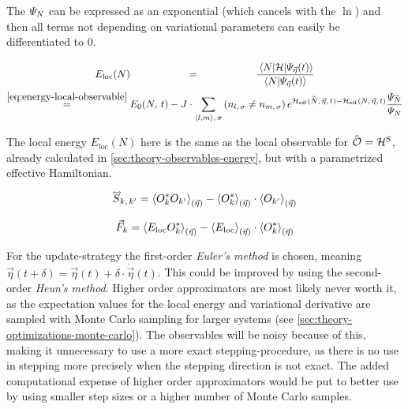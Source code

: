 The $\psiN$ can be expressed as an exponential (which cancels with the $\ln$) and then all terms not depending on variational parameters can easily be differentiated to 0.

\begin{equation}
    \label{eq:local-energy-definition}
    \begin{gathered}
        E_\text{loc}(N) \stackrel{\phantom{\ref{eq:energy-local-observable}}}{=} \frac{
            \bracketHelper{N}{\hamiltonian}{\psiEta{\vec{\eta}}{t}}
        }{
            \braketHelper{N}{\psiEta{\vec{\eta}}{t}}
        } 
        \\
        \stackrel{\ref{eq:energy-local-observable}}{=}
        E_0(N,\,t)-
        J \cdot \neighborsumWSpin{l}{m}{\sigma}
        \left(n_{l,\,\sigma} \neq n_{m,\,\sigma}\right)
            e^{\HeffOft[\vphantom{N}\smash{\tilde{N}},\,\vec{\eta}]-\HeffOft[N,\,\vec{\eta}]}
        \frac{
            \psiN[\vphantom{N}\smash{\tilde{N}}]
        }{
            \psiN[N]
        }
    \end{gathered}
\end{equation}

The local energy $E_\text{loc}(N)$ here is the same as the local observable  for $\ObservableOp = \pictureHamiltonian[\schroedingerPicture]$, already calculated in \autoref{sec:theory-observables-energy}, but with a parametrized effective Hamiltonian.

\begin{equation}
    \label{eq:covariance-matrix}
    \matvec{S}_{k,\, k'} = \timelessEtaExpectationVal{O_{k}^\ast O_{k'}} - \timelessEtaExpectationVal{O_{k}^\ast} \cdot \timelessEtaExpectationVal{O_{k'} \vphantom{O_{k}^\ast}}
\end{equation}

\begin{equation}
    \label{eq:tdvp-force}
    \vec{F}_k = \timelessEtaExpectationVal{E_\text{loc} O_{k}^\ast} - \timelessEtaExpectationVal{E_\text{loc}  \vphantom{O_{k}^\ast}} \cdot \timelessEtaExpectationVal{O_{k}^\ast}
\end{equation}


For the update-strategy the first-order \emph{Euler's method} is chosen, meaning $\vec{\eta}(t + \delta) = \vec{\eta}(t) + \delta \cdot \dot{\vec{\eta}}(t)$.
This could be improved by using the second-order \emph{Heun's method}. 
Higher order approximators are most likely never worth it, as the expectation values for the local energy and variational derivative are sampled with Monte Carlo sampling for larger systems (see \autoref{sec:theory-optimizations-monte-carlo}).
The observables will be noisy because of this, making it unnecessary to use a more exact stepping-procedure, as there is no use in stepping more precisely when the stepping direction is not exact.
The added computational expense of higher order approximators would be put to better use by using smaller step sizes or a higher number of Monte Carlo samples.

